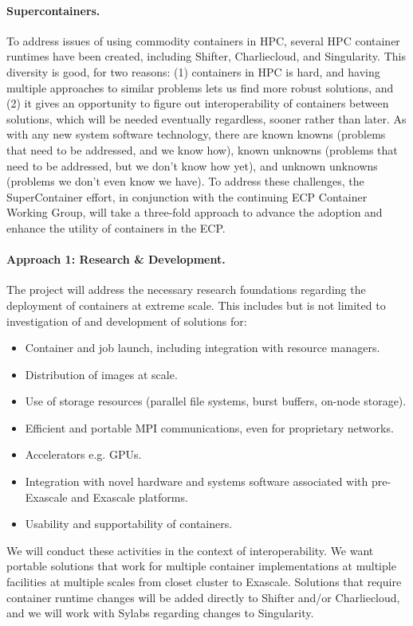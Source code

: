 \paragraph{Supercontainers.}

To address issues of using commodity containers in HPC, several HPC container runtimes have been created, including Shifter, Charliecloud, and Singularity. This diversity is good, for two reasons: (1) containers in HPC is hard, and having multiple approaches to similar problems lets us find more robust solutions, and (2) it gives an opportunity to figure out interoperability of containers between solutions, which will be needed eventually regardless, sooner rather than later.  As with any new system software technology, there are known knowns (problems that need to be addressed, and we know how), known unknowns (problems that need to be addressed, but we don’t know how yet), and unknown unknowns (problems we don’t even know we have).  To address these challenges, the SuperContainer effort, in conjunction with the continuing ECP Container Working Group, will take a three-fold approach to advance the adoption and enhance the utility of containers in the ECP. 

\paragraph{Approach 1: Research \& Development.}
The project will address the necessary research foundations regarding the deployment of containers at extreme scale. This includes but is not limited to investigation of and development of solutions for:
\begin{itemize}
\item Container and job launch, including integration with resource managers.
\item	Distribution of images at scale.
\item	Use of storage resources (parallel file systems, burst buffers, on-node storage).
\item	Efficient and portable MPI communications, even for proprietary networks.
\item	Accelerators e.g. GPUs.
\item	Integration with novel hardware and systems software associated with pre-Exascale and  Exascale platforms.
\item	Usability and supportability of containers.
\end{itemize}

We will conduct these activities in the context of interoperability. We want portable solutions that work for multiple container implementations at multiple facilities at multiple scales from closet cluster to Exascale.
Solutions that require container runtime changes will be added directly to Shifter and/or Charliecloud, and we will work with Sylabs regarding changes to Singularity.


